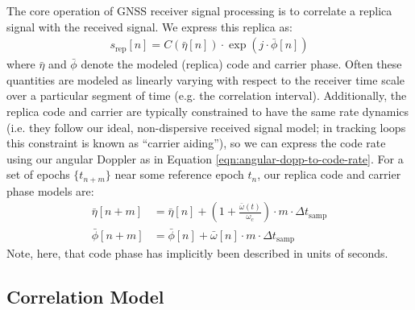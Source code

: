 \documentclass{article}
\begin{document}
The core operation of GNSS receiver signal processing is to correlate a replica signal with the received signal.  We express this replica as:
\begin{align}
    s_\text{rep}[n] = C(\bar{\eta}[n]) \cdot \exp(j\cdot \bar{\phi}[n])
\end{align}
%
where $\bar{\eta}$ and $\bar{\phi}$ denote the modeled (replica) code and carrier phase.  Often these quantities are modeled as linearly varying with respect to the receiver time scale over a particular segment of time (e.g. the correlation interval).  Additionally, the replica code and carrier are typically constrained to have the same rate dynamics (i.e. they follow our ideal, non-dispersive received signal model; in tracking loops this constraint is known as ``carrier aiding''), so we can express the code rate using our angular Doppler as in Equation \ref{eqn:angular-dopp-to-code-rate}.  For a set of epochs $\{t_{n+m}\}$ near some reference epoch $t_n$, our replica code and carrier phase models are:
%
\begin{align}
    \bar{\eta}[n+m]  &= \bar{\eta}[n] + \left(1 + \frac{\bar{\omega}(t)}{\omega_c} \right) \cdot m \cdot \Delta t_\text{samp}  \\
    \bar{\phi}[n+m] &= \bar{\phi}[n] + \bar{\omega}[n] \cdot m \cdot \Delta t_\text{samp}
\end{align}
%
Note, here, that code phase has implicitly been described in units of seconds.

\subsection{Correlation Model}
\end{document}
